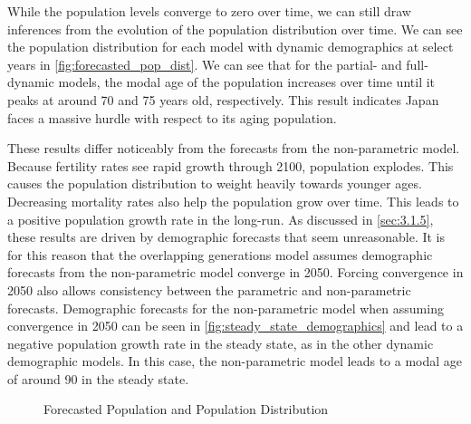 \documentclass[10pt]{article}
\numberwithin{equation}{subsection}
\newcommand*{\FigureDir}{../../graphs}
\begin{document}
\par While the population levels converge to zero over time, we can still draw inferences from the evolution of the population distribution over time. We can see the population distribution for each model with dynamic demographics at select years in \autoref{fig:forecasted_pop_dist}. We can see that for the partial- and full-dynamic models, the modal age of the population increases over time until it peaks at around 70 and 75 years old, respectively. This result indicates Japan faces a massive hurdle with respect to its aging population.

\par These results differ noticeably from the forecasts from the non-parametric model. Because fertility rates see rapid growth through 2100, population explodes. This causes the population distribution to weight heavily towards younger ages. Decreasing mortality rates also help the population grow over time. This leads to a positive population growth rate in the long-run. As discussed in \autoref{sec:3.1.5}, these results are driven by demographic forecasts that seem unreasonable. It is for this reason that the overlapping generations model assumes demographic forecasts from the non-parametric model converge in 2050. Forcing convergence in 2050 also allows consistency between the parametric and non-parametric forecasts. Demographic forecasts for the non-parametric model when assuming convergence in 2050 can be seen in \autoref{fig:steady_state_demographics} and lead to a negative population growth rate in the steady state, as in the other dynamic demographic models. In this case, the non-parametric model leads to a modal age of around 90 in the steady state.

\begin{figure}[!ht]
   \centering
   \caption{\label{fig:forecasted_pop_dist}Forecasted Population and Population Distribution}
\end{figure}
\end{document}
